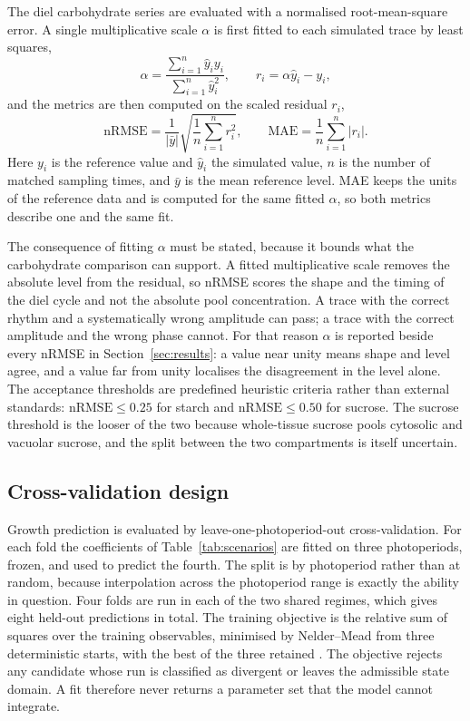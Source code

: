 The diel carbohydrate series are evaluated with a normalised root-mean-square
error. A single multiplicative scale $\alpha$ is first fitted to each simulated
trace by least squares,
\begin{equation}
\alpha = \frac{\sum_{i=1}^{n} \hat{y}_i y_i}{\sum_{i=1}^{n} \hat{y}_i^{2}},
\qquad
r_i = \alpha \hat{y}_i - y_i ,
\label{eq:alpha}
\end{equation}
and the metrics are then computed on the scaled residual $r_i$,
\begin{equation}
\mathrm{nRMSE} = \frac{1}{|\bar{y}|}
\sqrt{\frac{1}{n}\sum_{i=1}^{n} r_i^{2}},
\qquad
\mathrm{MAE} = \frac{1}{n}\sum_{i=1}^{n} |r_i| .
\label{eq:nrmse}
\end{equation}
Here $y_i$ is the reference value and $\hat{y}_i$ the simulated value, $n$ is
the number of matched sampling times, and $\bar{y}$ is the mean reference
level. MAE
keeps the units of the reference data and is computed for the same fitted
$\alpha$, so both metrics describe one and the same fit.

The consequence of fitting $\alpha$ must be stated, because it bounds what the
carbohydrate comparison can support. A fitted multiplicative scale removes the
absolute level from the residual, so nRMSE scores the shape and the timing of
the diel cycle and not the absolute pool concentration. A trace with the
correct rhythm and a systematically wrong amplitude can pass; a trace with the
correct amplitude and the wrong phase cannot. For that reason $\alpha$ is
reported beside every nRMSE in Section~\ref{sec:results}: a value near unity
means shape and level agree, and a value far from unity localises the
disagreement in the level alone. The acceptance thresholds are
predefined heuristic criteria rather than external standards: $\mathrm{nRMSE}
\le 0.25$ for starch and $\mathrm{nRMSE} \le 0.50$ for sucrose. The sucrose
threshold is the looser of the two because whole-tissue sucrose pools cytosolic
and vacuolar sucrose, and the split between the two compartments is itself
uncertain.

\subsection{Cross-validation design}
\label{sec:crossval_design}

Growth prediction is evaluated by leave-one-photoperiod-out cross-validation.
For each fold the coefficients of Table~\ref{tab:scenarios} are fitted on three
photoperiods, frozen, and used to predict the fourth. The split is by
photoperiod rather than at random, because interpolation across the photoperiod
range is exactly the ability in question. Four folds are run in each of the two
shared regimes, which gives eight held-out predictions in total. The training
objective is the relative sum of squares over the training observables,
minimised by Nelder--Mead from three deterministic starts, with the best of the
three retained \citep{Press2007}. The objective rejects any candidate whose run is
classified as divergent or leaves the admissible state domain. A fit therefore
never returns a parameter set that the model cannot integrate.

